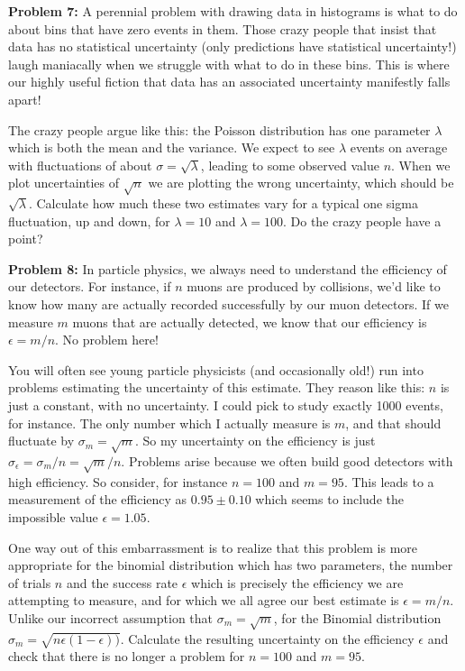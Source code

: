 \documentclass[12pt,oneside]{book}
\begin{document}
\noindent
{\bf Problem 7:}  A perennial problem with drawing data in histograms is what to do about bins that have zero events in them.  Those crazy people that insist that data has no statistical uncertainty (only predictions have statistical uncertainty!) laugh maniacally when we struggle with what to do in these bins.  This is where our highly useful fiction that data has an associated uncertainty manifestly falls apart! 

The crazy people argue like this: the Poisson distribution has one parameter $\lambda$ which is both the mean and the variance.  We expect to see $\lambda$ events on average with fluctuations of about $\sigma = \sqrt{\lambda}$, leading to some observed value $n$.  When we plot uncertainties of $\sqrt{n}$ we are plotting the wrong uncertainty, which should be $\sqrt{\lambda}$.  Calculate how much these two estimates vary for a typical one sigma fluctuation, up and down, for $\lambda=10$ and $\lambda=100$.  Do the crazy people have a point? \\ \vskip 0.25cm

\noindent
{\bf Problem 8:}  In particle physics, we always need to understand the efficiency of our detectors.  For instance, if $n$ muons are produced by collisions, we'd like to know how many are actually recorded successfully by our muon detectors.  If we measure $m$ muons that are actually detected, we know that our efficiency is $\epsilon = m/n$.  No problem here!

You will often see young particle physicists (and occasionally old!) run into problems estimating the uncertainty of this estimate.  They reason like this:  $n$ is just a constant, with no uncertainty.  I could pick to study exactly 1000 events, for instance.  The only number which I actually measure is $m$, and that should fluctuate by $\sigma_m = \sqrt{m}$.  So my uncertainty on the efficiency is just $\sigma_\epsilon = \sigma_m/n = \sqrt{m}/n$.  Problems arise because we often build good detectors with high efficiency.  So consider, for instance $n=100$ and $m=95$.  This leads to a measurement of the efficiency as $0.95 \pm 0.10$ which seems to include the impossible value $\epsilon = 1.05$.

One way out of this embarrassment is to realize that this problem is more appropriate for the binomial distribution which has two parameters, the number of trials $n$ and the success rate $\epsilon$ which is precisely the efficiency we are attempting to measure, and for which we all agree our best estimate is $\epsilon = m/n$.  Unlike our incorrect assumption that $\sigma_m = \sqrt{m}$, for the Binomial distribution
$\sigma_m = \sqrt{n \epsilon (1 - \epsilon))}$.  Calculate the resulting uncertainty on the efficiency 
$\epsilon$ and check that there is no longer a problem for $n=100$ and $m=95$.
\end{document}
